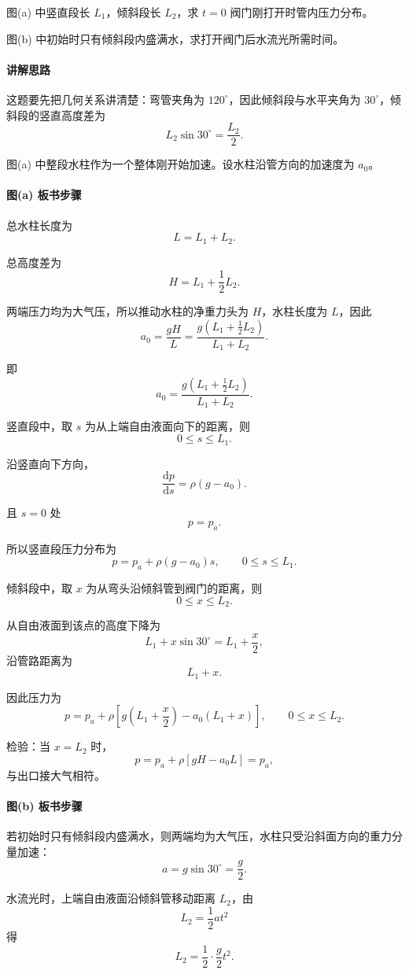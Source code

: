 ﻿\documentclass[12pt,a4paper]{ctexart}
\newcommand{\dd}{\mathrm d}
\newcommand{\pa}{p_a}
\begin{document}
图(a) 中竖直段长 $L_1$，倾斜段长 $L_2$，求 $t=0$ 阀门刚打开时管内压力分布。

图(b) 中初始时只有倾斜段内盛满水，求打开阀门后水流光所需时间。

\paragraph{讲解思路}
这题要先把几何关系讲清楚：弯管夹角为 $120^\circ$，因此倾斜段与水平夹角为 $30^\circ$，倾斜段的竖直高度差为
\[
L_2\sin30^\circ=\frac{L_2}{2}.
\]

图(a) 中整段水柱作为一个整体刚开始加速。设水柱沿管方向的加速度为 $a_0$。

\paragraph{图(a) 板书步骤}
总水柱长度为
\[
L=L_1+L_2.
\]

总高度差为
\[
H=L_1+\frac12L_2.
\]

两端压力均为大气压，所以推动水柱的净重力头为 $H$，水柱长度为 $L$，因此
\[
a_0=\frac{gH}{L}
=\frac{g\left(L_1+\frac12L_2\right)}{L_1+L_2}.
\]

即
\[
\boxed{
a_0=\frac{g\left(L_1+\frac12L_2\right)}{L_1+L_2}.
}
\]

竖直段中，取 $s$ 为从上端自由液面向下的距离，则
\[
0\le s\le L_1.
\]

沿竖直向下方向，
\[
\frac{\dd p}{\dd s}=\rho(g-a_0).
\]

且 $s=0$ 处
\[
p=\pa.
\]

所以竖直段压力分布为
\[
\boxed{
p=\pa+\rho(g-a_0)s,\qquad 0\le s\le L_1.
}
\]

倾斜段中，取 $x$ 为从弯头沿倾斜管到阀门的距离，则
\[
0\le x\le L_2.
\]

从自由液面到该点的高度下降为
\[
L_1+x\sin30^\circ=L_1+\frac{x}{2},
\]
沿管路距离为
\[
L_1+x.
\]

因此压力为
\[
\boxed{
p=\pa+\rho\left[
g\left(L_1+\frac{x}{2}\right)
-a_0(L_1+x)
\right],
\qquad 0\le x\le L_2.
}
\]

检验：当 $x=L_2$ 时，
\[
p=\pa+\rho[gH-a_0L]=\pa,
\]
与出口接大气相符。

\paragraph{图(b) 板书步骤}
若初始时只有倾斜段内盛满水，则两端均为大气压，水柱只受沿斜面方向的重力分量加速：
\[
a=g\sin30^\circ=\frac g2.
\]

水流光时，上端自由液面沿倾斜管移动距离 $L_2$，由
\[
L_2=\frac12at^2
\]
得
\[
L_2=\frac12\cdot \frac g2 t^2.
\]
\end{document}
